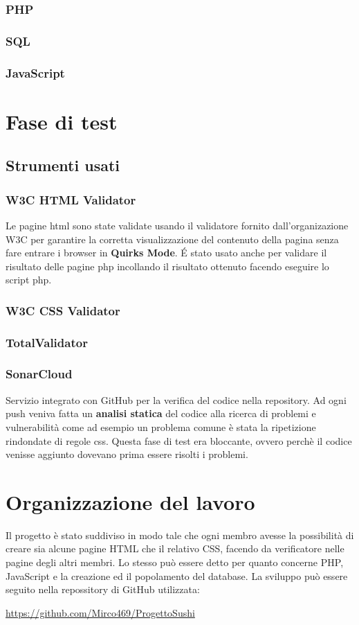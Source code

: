 \documentclass{article}
\begin{document}
			\subsubsection{PHP}
			\subsubsection{SQL}
			\subsubsection{JavaScript}
	\section{Fase di test}
		\subsection{Strumenti usati}
			\subsubsection{W3C HTML Validator}
				Le pagine html sono state validate usando il validatore fornito dall'organizazione W3C per garantire la corretta visualizzazione del contenuto della pagina senza fare entrare i browser in {\bfseries Quirks Mode}. \'E stato usato anche per validare il risultato delle pagine php incollando il risultato ottenuto facendo eseguire lo script php.
			\subsubsection{W3C CSS Validator}
			\subsubsection{TotalValidator}
			\subsubsection{SonarCloud}
				Servizio integrato con GitHub per la verifica del codice nella repository. Ad ogni push veniva fatta un {\bfseries analisi statica} del codice alla ricerca di problemi e vulnerabilità come ad esempio un problema comune è stata la ripetizione rindondate di regole css. Questa fase di test era bloccante, ovvero perchè il codice venisse aggiunto dovevano prima essere risolti i problemi.
	\section{Organizzazione del lavoro}
		Il progetto è stato suddiviso in modo tale che ogni membro avesse la possibilità di creare sia alcune pagine HTML che il relativo CSS, facendo da verificatore nelle pagine degli altri membri.
		Lo stesso può essere detto per quanto concerne PHP, JavaScript e la creazione ed il popolamento del database.
		La sviluppo può essere seguito nella repossitory di GitHub utilizzata:
		\newline
		\newline
		\centerline{ \url{https://github.com/Mirco469/ProgettoSushi}}
\end{document}
